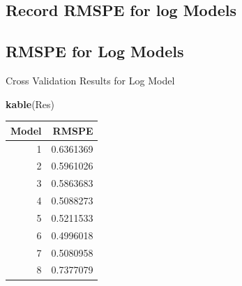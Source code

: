 \documentclass[]{book}
\newenvironment{Shaded}{\begin{snugshade}}{\end{snugshade}}
\newcommand{\KeywordTok}[1]{\textcolor[rgb]{0.13,0.29,0.53}{\textbf{#1}}}
\newcommand{\DecValTok}[1]{\textcolor[rgb]{0.00,0.00,0.81}{#1}}
\newcommand{\StringTok}[1]{\textcolor[rgb]{0.31,0.60,0.02}{#1}}
\newcommand{\OperatorTok}[1]{\textcolor[rgb]{0.81,0.36,0.00}{\textbf{#1}}}
\newcommand{\NormalTok}[1]{#1}
\begin{document}
\subsection{Record RMSPE for log
Models}\label{record-rmspe-for-log-models}

\begin{Shaded}
\end{Shaded}

\subsection{RMSPE for Log Models}\label{rmspe-for-log-models}

Cross Validation Results for Log Model

\begin{Shaded}
\begin{Highlighting}[]
\KeywordTok{kable}\NormalTok{(Res)}
\end{Highlighting}
\end{Shaded}

\begin{tabular}{r|r}
\hline
Model & RMSPE\\
\hline
1 & 0.6361369\\
\hline
2 & 0.5961026\\
\hline
3 & 0.5863683\\
\hline
4 & 0.5088273\\
\hline
5 & 0.5211533\\
\hline
6 & 0.4996018\\
\hline
7 & 0.5080958\\
\hline
8 & 0.7377079\\
\hline
\end{tabular}
\end{document}
